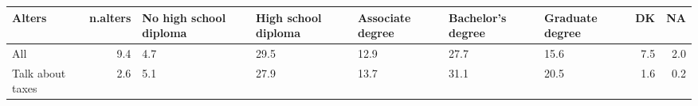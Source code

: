 \begin{table}[ht]
\centering
\begin{tabular}{lrL{2cm}L{2cm}L{2cm}L{2cm}L{2cm}rr}
  \hline
Alters & n.alters & No high school diploma & High school diploma & Associate degree & Bachelor's degree & Graduate degree & DK & NA \\ 
  \hline
All & 9.4 & 4.7 & 29.5 & 12.9 & 27.7 & 15.6 & 7.5 & 2.0 \\ 
  Talk about taxes & 2.6 & 5.1 & 27.9 & 13.7 & 31.1 & 20.5 & 1.6 & 0.2 \\ 
   \hline
\end{tabular}
\end{table}
